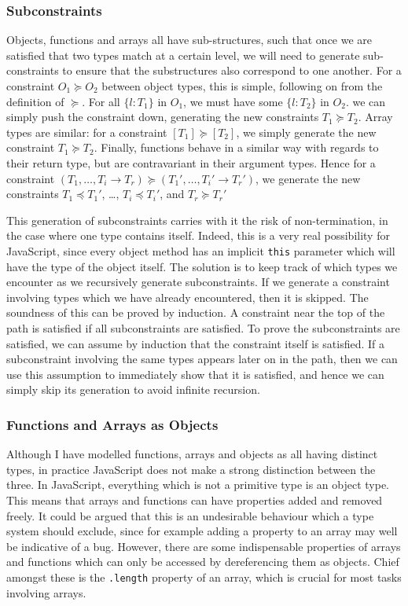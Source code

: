 \documentclass[12pt,a4paper,twoside,openright]{report}
\theoremstyle{definition}
\theoremstyle{dotless}
\newcommand*{\js}{\texttt}
\begin{document}
\subsubsection*{Subconstraints}
Objects, functions and arrays all have sub-structures, such that once we are
satisfied that two types match at a certain level, we will need to generate
sub-constraints to ensure that the substructures also correspond to one
another. For a constraint $O_1\succeq O_2$ between object types, this is
simple, following on from the definition of $\succeq$. For all $\{l:T_1\}$ in
$O_1$, we must have some $\{l:T_2\}$ in $O_2$. we can simply push the
constraint down, generating the new constraints $T_1\succeq T_2$. Array types
are similar: for a constraint $[T_1]\succeq[T_2]$, we simply generate the new
constraint $T_1\succeq T_2$. Finally, functions behave in a similar way with
regards to their return type, but are contravariant in their argument types.
Hence for a constraint $(T_1, \ldots, T_i \rightarrow T_r) \succeq(T_1',
\ldots, T_i' \rightarrow T_r')$, we generate the new constraints $T_1\preceq
T_1'$, \dots, $T_i\preceq T_i'$, and $T_r \succeq T_r'$

This generation of subconstraints carries with it the risk of non-termination,
in the case where one type contains itself. Indeed, this is a very real
possibility for JavaScript, since every object method has an implicit \js{this}
parameter which will have the type of the object itself. The solution is to
keep track of which types we encounter as we recursively generate
subconstraints. If we generate a constraint involving types which we have
already encountered, then it is skipped. The soundness of this can be proved by
induction. A constraint near the top of the path is satisfied if all
subconstraints are satisfied. To prove the subconstraints are satisfied, we can
assume by induction that the constraint itself is satisfied. If a subconstraint
involving the same types appears later on in the path, then we can use this
assumption to immediately show that it is satisfied, and hence we can simply
skip its generation to avoid infinite recursion.

\subsubsection*{Functions and Arrays as Objects}

Although I have modelled functions, arrays and objects as all having distinct
types, in practice JavaScript does not make a strong distinction between the
three. In JavaScript, everything which is not a primitive type is an object
type. This means that arrays and functions can have properties added and
removed freely. It could be argued that this is an undesirable behaviour which
a type system should exclude, since for example adding a property to an array
may well be indicative of a bug. However, there are some indispensable
properties of arrays and functions which can only be accessed by dereferencing
them as objects. Chief amongst these is the \js{.length} property of an array,
which is crucial for most tasks involving arrays.
\end{document}
